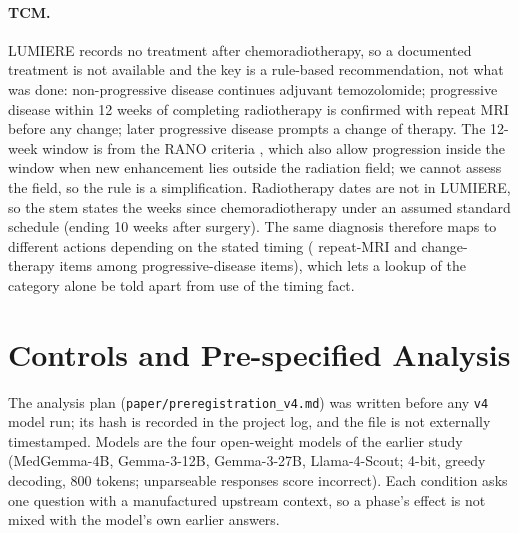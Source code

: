 \paragraph{TCM.} LUMIERE records no treatment after chemoradiotherapy, so a documented treatment is not available and the key is a rule-based recommendation, not what was done: non-progressive disease continues adjuvant temozolomide; progressive disease within 12 weeks of completing radiotherapy is confirmed with repeat MRI before any change; later progressive disease prompts a change of therapy. The 12-week window is from the RANO criteria \citep{wen2010updated}, which also allow progression inside the window when new enhancement lies outside the radiation field; we cannot assess the field, so the rule is a simplification. Radiotherapy dates are not in LUMIERE, so the stem states the weeks since chemoradiotherapy under an assumed standard schedule (ending 10 weeks after surgery). The same diagnosis therefore maps to different actions depending on the stated timing (\vfourTcmConfirm{} repeat-MRI and \vfourTcmEscalate{} change-therapy items among \vfourTcmPdItems{} progressive-disease items), which lets a lookup of the category alone be told apart from use of the timing fact.

\section{Controls and Pre-specified Analysis}
\label{sec:controls}

The analysis plan (\texttt{paper/preregistration\_v4.md}) was written before any \texttt{v4} model run; its hash is recorded in the project log, and the file is not externally timestamped. Models are the four open-weight models of the earlier study (MedGemma-4B, Gemma-3-12B, Gemma-3-27B, Llama-4-Scout; 4-bit, greedy decoding, 800 tokens; unparseable responses score incorrect). Each condition asks one question with a manufactured upstream context, so a phase's effect is not mixed with the model's own earlier answers.

